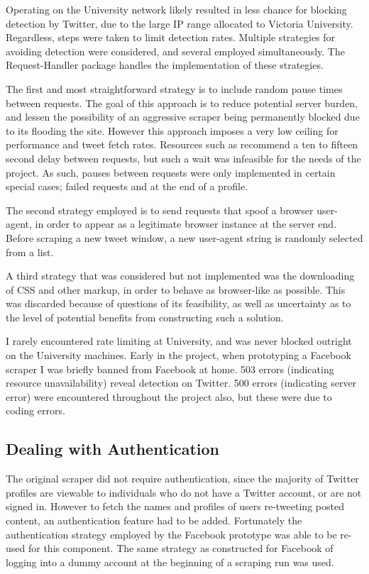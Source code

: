 Operating on the University network likely resulted in less chance for blocking detection by Twitter, due to the large IP range allocated to Victoria University. Regardless, steps were taken to limit detection rates. Multiple strategies for avoiding detection were considered, and several employed simultaneously. The Request-Handler package handles the implementation of these strategies.

The first and most straightforward strategy is to include random pause times between requests. The goal of this approach is to reduce potential server burden, and lessen the possibility of an aggressive scraper being permanently blocked due to its flooding the site. However this approach imposes a very low ceiling for performance and tweet fetch rates. Resources such as \cite{} recommend a ten to fifteen second delay between requests, but such a wait was infeasible for the needs of the project. As such, pauses between requests were only implemented in certain special cases; failed requests and at the end of a profile. 

The second strategy employed is to send requests that spoof a browser user-agent, in order to appear as a legitimate browser instance at the server end. Before scraping a new tweet window, a new user-agent string is randomly selected from a list. 

A third strategy that was considered but not implemented was the downloading of CSS and other markup, in order to behave as browser-like as possible. This was discarded because of questions of its feasibility, as well as uncertainty as to the level of potential benefits from constructing such a solution. 

I rarely encountered rate limiting at University, and was never blocked outright on the University machines. Early in the project, when prototyping a Facebook scraper I was briefly banned from Facebook at home. 503 errors (indicating resource unavailability) reveal detection on Twitter. 500 errors (indicating server error)  were encountered throughout the project also, but these were due to coding errors. 

\subsection{Dealing with Authentication}

The original scraper did not require authentication, since the majority of Twitter profiles are viewable to individuals who do not have a Twitter account, or are not signed in. However to fetch the names and profiles of users re-tweeting posted content, an authentication feature had to be added. Fortunately the authentication strategy employed by the Facebook prototype was able to be re-used for this component. The same strategy as constructed for Facebook of logging into a dummy account at the beginning of a scraping run was used.  


